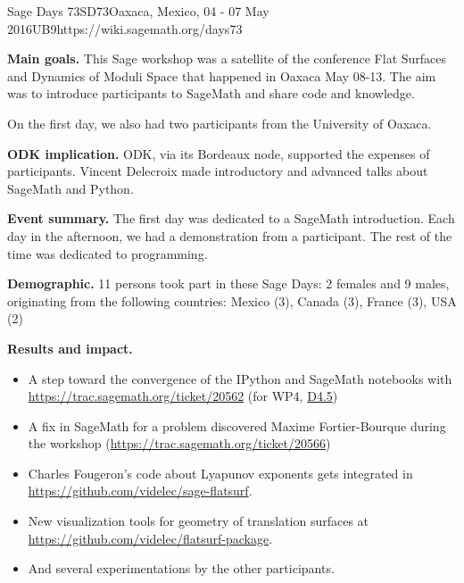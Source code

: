 \begin{event}{Sage Days 73}{SD73}{Oaxaca, Mexico, 04 - 07 May 2016}{UB}{9}{https://wiki.sagemath.org/days73}

\textbf{Main goals.}
This Sage workshop was a satellite of the conference Flat Surfaces and
Dynamics of Moduli Space that happened in Oaxaca May 08-13. The aim was to
introduce participants to SageMath and share code and knowledge.

On the first day, we also had two participants from the University of 
Oaxaca.

\textbf{ODK implication.} ODK, via its Bordeaux node, supported the expenses
of participants. Vincent Delecroix made introductory and advanced talks about
SageMath and Python.
  
\textbf{Event summary.} The first day was dedicated to a SageMath introduction.
Each day in the afternoon, we had a demonstration from a participant. The rest
of the time was dedicated to programming.

\textbf{Demographic.}
11 persons took part in these Sage Days: 2 females and 9 males, originating
from the following countries: Mexico (3), Canada (3), France (3), USA (2)

\textbf{Results and impact.}
\begin{itemize}
\item A step toward the convergence of the IPython and SageMath notebooks with \url{https://trac.sagemath.org/ticket/20562} (for WP4, \href{https://github.com/OpenDreamKit/OpenDreamKit/issues/94}{D4.5})
\item A fix in SageMath for a problem discovered Maxime Fortier-Bourque during the workshop (\url{https://trac.sagemath.org/ticket/20566})
\item Charles Fougeron's code about Lyapunov exponents gets integrated in \url{https://github.com/videlec/sage-flatsurf}.
\item New visualization tools for geometry of translation surfaces at \url{https://github.com/videlec/flatsurf-package}.
\item And several experimentations by the other participants.
\end{itemize}

\end{event}
